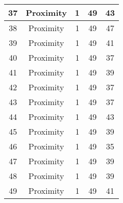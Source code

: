 \documentclass[results.tex]{subfiles}
\begin{document}
\begin{center}
\begin{tabular}{| c || c | c | c | c |}
            \hline
            37                      & Proximity                    & 1                      & 49                      & 43                   \\
            \hline
            38                      & Proximity                    & 1                      & 49                      & 47                   \\
            \hline
            39                      & Proximity                    & 1                      & 49                      & 41                   \\
            \hline
            40                      & Proximity                    & 1                      & 49                      & 37                   \\
            \hline
            41                      & Proximity                    & 1                      & 49                      & 39                   \\
            \hline
            42                      & Proximity                    & 1                      & 49                      & 37                   \\
            \hline
            43                      & Proximity                    & 1                      & 49                      & 37                   \\
            \hline
            44                      & Proximity                    & 1                      & 49                      & 43                   \\
            \hline
            45                      & Proximity                    & 1                      & 49                      & 39                   \\
            \hline
            46                      & Proximity                    & 1                      & 49                      & 35                   \\
            \hline
            47                      & Proximity                    & 1                      & 49                      & 39                   \\
            \hline
            48                      & Proximity                    & 1                      & 49                      & 39                   \\
            \hline
            49                      & Proximity                    & 1                      & 49                      & 41                   \\
            \hline
        \end{tabular}
    \end{center}
\end{document}

